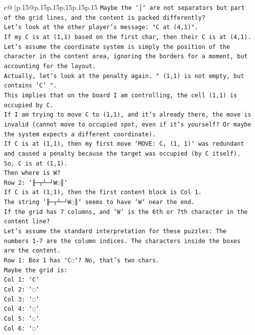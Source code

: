 \documentclass{article}
\begin{document}
{\begin{supertabular}{c@{$\;$}|p{.15\linewidth}@{}p{.15\linewidth}p{.15\linewidth}p{.15\linewidth}p{.15\linewidth}p{.15\linewidth}}
{{{\texttt{Maybe the `│` are not separators but part of the grid lines, and the content is packed differently?} \\
\texttt{Let's look at the other player's message: "C at (4,1)".} \\
\texttt{If my C is at (1,1) based on the first char, then their C is at (4,1).} \\
\texttt{Let's assume the coordinate system is simply the position of the character in the content area, ignoring the borders for a moment, but accounting for the layout.} \\
\texttt{Actually, let's look at the penalty again. " (1,1) is not empty, but contains 'C' ".} \\
\texttt{This implies that on the board I am controlling, the cell (1,1) is occupied by C.} \\
\texttt{If I am trying to move C to (1,1), and it's already there, the move is invalid (cannot move to occupied spot, even if it's yourself? Or maybe the system expects a different coordinate).} \\
\texttt{If C is at (1,1), then my first move `MOVE: C, (1, 1)` was redundant and caused a penalty because the target was occupied (by C itself).} \\
\texttt{So, C is at (1,1).} \\
\texttt{Then where is W?} \\
\texttt{Row 2: `╟─┬┴─┘W◌║`} \\
\texttt{If C is at (1,1), then the first content block is Col 1.} \\
\texttt{The string `╟─┬┴─┘W◌║` seems to have `W` near the end.} \\
\texttt{If the grid has 7 columns, and `W` is the 6th or 7th character in the content line?} \\
\texttt{Let's assume the standard interpretation for these puzzles: The numbers 1{-}7 are the column indices. The characters inside the boxes are the content.} \\
\texttt{Row 1: Box 1 has `C◌`? No, that's two chars.} \\
\texttt{Maybe the grid is:} \\
\texttt{Col 1: `C`} \\
\texttt{Col 2: `◌`} \\
\texttt{Col 3: `◌`} \\
\texttt{Col 4: `◌`} \\
\texttt{Col 5: `◌`} \\
\texttt{Col 6: `◌`} \\
}}}
\end{supertabular}}
\end{document}

